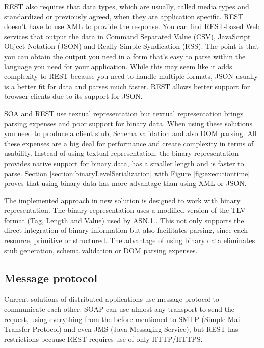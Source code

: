 REST also requires that data types, which are usually, called media types and standardized or previously agreed, when they are application specific. REST doesn’t have to use XML to provide the response. You can find REST-based Web services that output the data in Command Separated Value (CSV), JavaScript Object Notation (JSON) and Really Simple Syndication (RSS). The point is that you can obtain the output you need in a form that’s easy to parse within the language you need for your application. While this may seem like it adds complexity to REST because you need to handle multiple formats, JSON usually is a better fit for data and parses much faster. REST allows better support for browser clients due to its support for JSON.

SOA and REST use textual representation but textual representation brings parsing expenses and poor support for binary data. When using these solutions you need to produce a client stub, Schema validation and also DOM parsing. All these expenses are a big deal for performance and create complexity in terms of usability. Instead of using textual representation, the binary representation provides native support for binary data, has a smaller length and is faster to parse. Section \ref{section:binaryLevelSerialization} with Figure \ref{fig:executiontime} proves that using binary data has more advantage than using XML or JSON.

The implemented approach in new solution is designed to work with binary representation. The binary representation uses a modified version of the TLV format (Tag, Length and Value) used by ASN.1 \citep{asn1:opt}. This not only supports the direct integration of binary information but also facilitates parsing, since each resource, primitive or structured. The advantage of using binary data eliminates stub generation, schema validation or DOM parsing expenses.

\subsection{Message protocol}
\label{section:mprotocol}

Current solutions of distributed applications use message protocol to communicate each other. SOAP can use almost any transport to send the request, using everything from the before mentioned to SMTP (Simple Mail Transfer Protocol) and even JMS (Java Messaging Service), but REST has restrictions because REST requires use of only HTTP/HTTPS.

